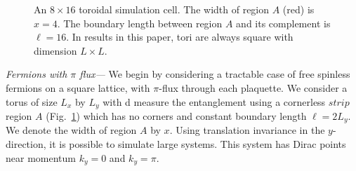 \documentclass[prl,aps,twocolumn,floatfix,amsmath,amssymb,superscriptaddress,tightenlines]{revtex4}
\begin{document}
 \begin{figure}[ht]
   \begin{center}
   \end{center}
   \caption{An $8 \times 16$ toroidal simulation cell.  The width of region $A$ (red) is $x=4$.  The boundary length between region $A$ and its complement is $\ell = 16$.  In results in this paper, tori are always square with dimension $L \times L$. }
   \label{fig:torus}
 \end{figure}
 

{\it Fermions with $\pi$ flux---}
We begin by considering a tractable case of
free spinless fermions on a square lattice, with $\pi$-flux through each plaquette.  We consider a torus of size $L_x$ by $L_y$ with
d measure the entanglement %
using a cornerless $strip$ region $A$ (Fig.~\ref{fig:torus}) which has no corners and constant boundary length $\ell = 2L_y$.
We denote the width of region $A$ by $x$.
Using translation invariance in the $y$-direction, it is possible to simulate large systems.  This system has Dirac points near momentum $k_y=0$ and $k_y=\pi$.
\end{document}
